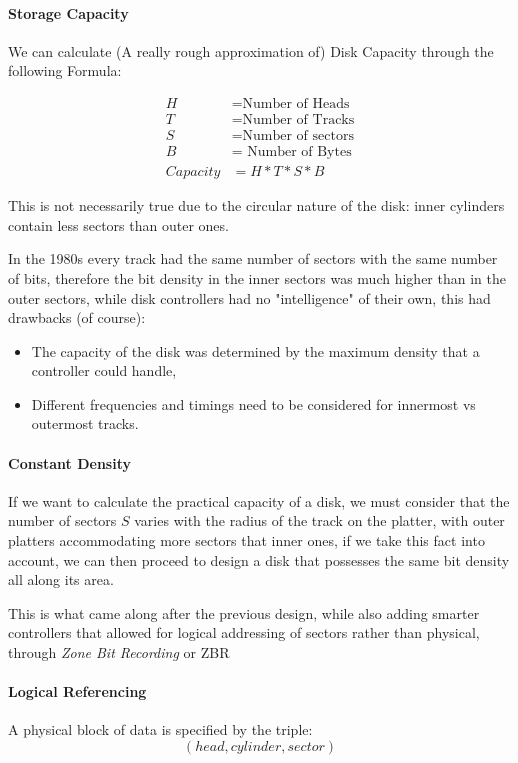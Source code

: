 \documentclass[openright, twoside]{report}
\theoremstyle{definition}
\theoremstyle{example}
\begin{document}
\paragraph{Storage Capacity}

We can calculate (A really rough approximation of) Disk Capacity through the following Formula:

\begin{align*}
	H &= \text{Number of Heads}\\
	T &= \text{Number of Tracks} \\
	S &= \text{Number of sectors} \\
	B &= \text{ Number of Bytes} \\
	Capacity &= H*T*S*B
\end{align*}

This is not necessarily true due to the circular nature of the disk: inner cylinders contain less sectors than 
outer ones.

In the 1980s every track had the same number of sectors with the same number of bits, therefore the bit density in 
the inner sectors was much higher than in the outer sectors, while disk controllers had no "intelligence" of their own,
this had drawbacks (of course):

\begin{itemize}
	\item The capacity of the disk was determined by the maximum density that a controller could handle,
	\item Different frequencies and timings need to be considered for innermost vs outermost tracks.
\end{itemize}

\paragraph{Constant Density}
If we want to calculate the practical capacity of a disk, we must consider that the number of sectors
$S$ varies with the radius of the track on the platter, with outer platters accommodating more sectors that
inner ones, if we take this fact into account, we can then proceed to design a disk that possesses the same 
bit density all along its area.

This is what came along after the previous design, while also adding smarter controllers that allowed for 
logical addressing of sectors rather than physical, through \emph{Zone Bit Recording} or ZBR

\paragraph{Logical Referencing}
A physical block of data is specified by the triple:
\[
	(head, cylinder, sector)
\]
\end{document}
